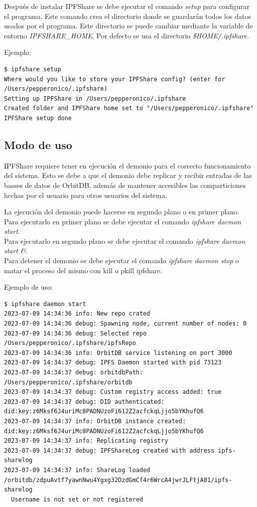 Después de instalar IPFShare se debe ejecutar el comando \textit{setup} para configurar el programa. Este comando crea el directorio donde se
guardarán todos los datos usados por el programa. Este directorio se puede cambiar mediante la variable de entorno \textit{IPFSHARE\_HOME}. Por defecto se usa el directorio \textit{\$HOME/.ipfshare}.

Ejemplo:
\begin{verbatim}
$ ipfshare setup
Where would you like to store your IPFShare config? (enter for /Users/pepperonico/.ipfshare)
Setting up IPFShare in /Users/pepperonico/.ipfshare
Created folder and IPFShare home set to "/Users/pepperonico/.ipfshare"
IPFShare setup done
\end{verbatim}
\subsection{Modo de uso}

IPFShare requiere tener en ejecución el demonio para el correcto funcionamiento del sistema. Esto se debe a que el demonio
debe replicar y recibir entradas de las basses de datos de OrbitDB, además de mantener accesibles las comparticiones hechas
por el usuario para otros usuarios del sistema.

La ejecución del demonio puede hacerse en segundo plano o en primer plano.
\\Para ejecutarlo en primer plano se debe ejecutar el comando \textit{ipfshare daemon start}.
\\Para ejecutarlo en segundo plano se debe ejecutar el comando \textit{ipfshare daemon start \&}.
\\Para detener el demonio se debe ejecutar el comando \textit{ipfshare daemon stop} o matar el proceso del mismo con kill o pkill ipfshare.

Ejemplo de uso:
\begin{verbatim}
$ ipfshare daemon start
2023-07-09 14:34:36 info: New repo crated
2023-07-09 14:34:36 debug: Spawning node, current number of nodes: 0
2023-07-09 14:34:36 debug: Selected repo /Users/pepperonico/.ipfshare/ipfsRepo
2023-07-09 14:34:36 info: OrbitDB service listening on port 3000
2023-07-09 14:34:37 debug: IPFS Daemon started with pid 73123
2023-07-09 14:34:37 debug: orbitdbPath: /Users/pepperonico/.ipfshare/orbitdb
2023-07-09 14:34:37 debug: Custom registry access added: true
2023-07-09 14:34:37 debug: DID authenticated: did:key:z6Mksf6J4uriMc8PADNUzoFi612Z2acfckqLjjo5bYKhufQ6
2023-07-09 14:34:37 info: OrbitDB instance created: did:key:z6Mksf6J4uriMc8PADNUzoFi612Z2acfckqLjjo5bYKhufQ6
2023-07-09 14:34:37 info: Replicating registry
2023-07-09 14:34:37 debug: IPFShareLog created with address ipfs-sharelog
2023-07-09 14:34:37 info: ShareLog loaded /orbitdb/zdpuAvtf7yawnNwu4Ygxg32DzdGmCf4r6WrcA4jwrJLFtjA81/ipfs-sharelog
  Username is not set or not registered
\end{verbatim}

